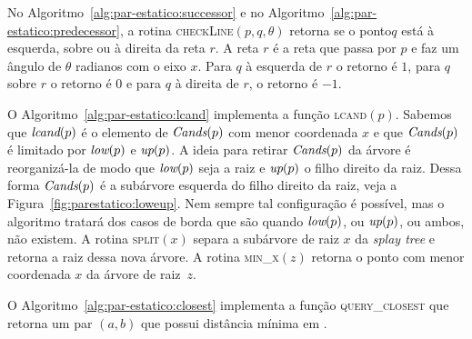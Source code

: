 No Algoritmo~\ref{alg:par-estatico:successor} e no Algoritmo~\ref{alg:par-estatico:predecessor}, a rotina
\textsc{checkLine}$(p, q, \theta)$ retorna se o ponto$q$ está à esquerda, sobre ou à direita da
reta $r$.
A reta $r$ é a reta que passa por $p$ e faz um ângulo de $\theta$ radianos com o eixo $x$.
Para $q$ à esquerda de $r$ o retorno é $1$, para $q$ sobre $r$ o retorno é $0$ e para $q$ à
direita de $r$, o retorno é $-1$.





O Algoritmo~\ref{alg:par-estatico:lcand} implementa a função \textsc{lcand}$(p)$.
Sabemos que $\textit{lcand}(p)$ é o elemento de $\textit{Cands}(p)$ com menor coordenada $x$ e que $\textit{Cands}(p)$ é
limitado por $\textit{low}(p)$ e $\textit{up}(p)$.
A ideia para retirar $\textit{Cands}(p)$ da árvore é reorganizá-la de modo que $\textit{low}(p)$ seja a raiz e
$\textit{up}(p)$ o filho direito da raiz.
Dessa forma $\textit{Cands}(p)$ é a subárvore esquerda do filho direito da raiz, veja a
Figura~\ref{fig:parestatico:loweup}.
Nem sempre tal configuração é possível, mas o algoritmo tratará dos casos de borda que são quando
$\textit{low}(p)$, ou $\textit{up}(p)$, ou ambos, não existem.
A rotina \textsc{split}$(x)$ separa a subárvore de raiz $x$ da \textit{splay tree} e retorna a
raiz dessa nova árvore.
A rotina \textsc{min\_x}$(z)$ retorna o ponto com menor coordenada $x$ da árvore de raiz~$z$.





O Algoritmo~\ref{alg:par-estatico:closest} implementa a função \textsc{query\_closest} que retorna um
par $(a,b)$ que possui distância mínima em \pontos.



